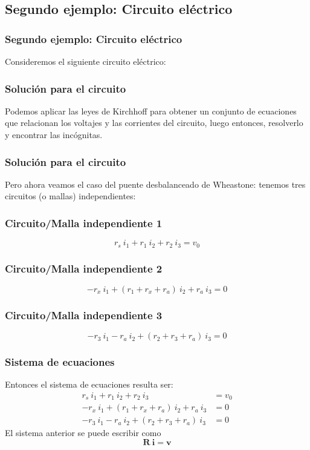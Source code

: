 \subsection{Segundo ejemplo: Circuito eléctrico}
\begin{frame}[fragile]
\frametitle{Segundo ejemplo: Circuito eléctrico}
Consideremos el siguiente circuito eléctrico:
\begin{figure}
	\centering
	
\end{figure}
\end{frame}
\begin{frame}
\frametitle{Solución para el circuito}
Podemos aplicar las leyes de Kirchhoff para obtener un conjunto de ecuaciones que relacionan los voltajes y las corrientes del circuito, luego entonces, resolverlo y encontrar las incógnitas.
\end{frame}
\begin{frame}
\frametitle{Solución para el circuito}
Pero ahora veamos el caso del puente desbalanceado de Wheastone: tenemos tres circuitos (o mallas) independientes:
\end{frame}
\begin{frame}[fragile]
\frametitle{Circuito/Malla independiente 1}
\begin{figure}
	\centering
	
\end{figure}
\[ r_{s} \: i_{1} + r_{1} \: i_{2} + r_{2} \: i_{3} = v_{0}\]
\end{frame}
\begin{frame}[fragile]
\frametitle{Circuito/Malla independiente 2}
\begin{figure}
	\centering
	
\end{figure}
\[ -r_{x} \: i_{1} + ( r_{1} + r_{x} + r_{a}) \: i_{2} + r_{a} \: i_{3} = 0\]
\end{frame}
\begin{frame}[fragile]
\frametitle{Circuito/Malla independiente 3}
\begin{figure}
	\centering
	
\end{figure}
\[ -r_{3} \: i_{1} - r_{a} \: i_{2} + ( r_{2} + r_{3} + r_{a}) \: i_{3} = 0\]
\end{frame}
\begin{frame}
\frametitle{Sistema de ecuaciones}
Entonces el sistema de ecuaciones resulta ser:
\begin{align*}
r_{s} \: i_{1} + r_{1} \: i_{2} + r_{2} \: i_{3} &= v_{0} \\
-r_{x} \: i_{1} + (r_{1} + r_{x} + r_{a}) \: i_{2} + r_{a} \: i_{3} &= 0 \\
-r_{3} \: i_{1} - r_{a} \: i_{2} + (r_{2} + r_{3} + r_{a}) \: i_{3} &= 0
\end{align*}
\pause
El sistema anterior se puede escribir como
\[ \mathbf{R \: i} = \mathbf{v}\]
\end{frame}
